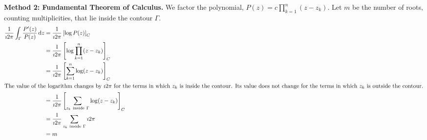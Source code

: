 {\begin{Solution}
  \textbf{Method 2: Fundamental Theorem of Calculus.}
  We factor the polynomial, $P(z) = c \prod_{k = 1}^n (z - z_k)$.  
  Let $m$ be the number of roots, counting multiplicities,
  that lie inside the contour $\Gamma$.
  \begin{align*}
    \frac{1}{\imath 2 \pi} \int_\Gamma \frac{P'(z)}{P(z)} \,\dd z
    &= \frac{1}{\imath 2 \pi} \left[ \log P(z) \right]_C \\
    &= \frac{1}{\imath 2 \pi} \left[ \log \prod_{k=1}^n (z - z_k) \right]_C \\
    &= \frac{1}{\imath 2 \pi} \left[ \sum_{k=1}^n \log (z - z_k) \right]_C \\
    \intertext{The value of the logarithm changes by $\imath 2 \pi$ for the terms
      in which $z_k$ is inside the contour.  Its value does not change for the terms
      in which $z_k$ is outside the contour.}
    &= \frac{1}{\imath 2 \pi} \left[ \sum_{z_k\ \mathrm{inside}\ \Gamma}
      \log (z - z_k) \right]_C \\
    &= \frac{1}{\imath 2 \pi} \sum_{z_k\ \mathrm{inside}\ \Gamma}
    \imath 2 \pi \\
    &= m
  \end{align*}
\end{Solution}










}
